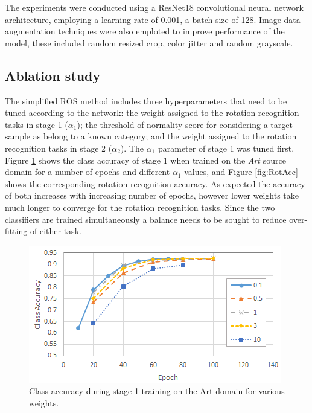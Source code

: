 \documentclass[10pt,twocolumn,letterpaper]{article}
\begin{document}
The experiments were conducted using a ResNet18 convolutional neural network architecture, employing a learning rate of 0.001, a batch size of 128. Image data augmentation techniques were also emploted to improve performance of the model, these included random resized crop, color jitter and random grayscale. 


\subsection{Ablation study}
\label{sec:ablation}

The simplified ROS method includes three hyperparameters that need to be tuned according to the network: the weight assigned to the rotation recognition tasks in stage 1 ($\alpha_1$); the threshold of normality score for considering a target sample as belong to a known category; and the weight assigned to the rotation recognition tasks in stage 2 ($\alpha_2$). The $\alpha_1$ parameter of stage 1 was tuned first. Figure \ref{fig:ClassAcc} shows the class accuracy of stage 1 when trained on the \textit{Art} source domain for a number of epochs and different $\alpha_1$ values, and Figure \ref{fig:RotAcc} shows the corresponding rotation recognition accuracy. As expected the accuracy of both increases with increasing number of epochs, however lower weights take much longer to converge for the rotation recognition tasks. Since the two classifiers are trained simultaneously a balance needs to be sought to reduce over-fitting of either task.

\begin{figure}[!htb]
  \centering
   \includegraphics[width=0.95\linewidth]{Figures/ClassAcc.png}
   \caption{Class accuracy during stage 1 training on the Art domain for various weights.}
   \label{fig:ClassAcc}
\end{figure}
\end{document}
